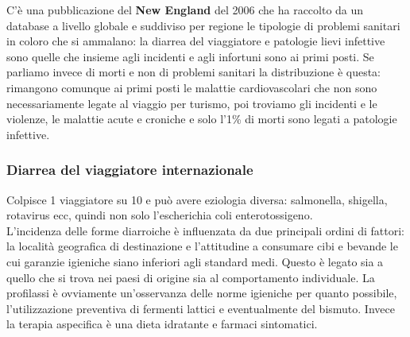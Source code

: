 C'è una pubblicazione del \textbf{New England} del 2006 che ha raccolto
da un database a livello globale e suddiviso per regione le tipologie di
problemi sanitari in coloro che si ammalano: la diarrea del viaggiatore
e patologie lievi infettive sono quelle che insieme agli incidenti e
agli infortuni sono ai primi posti. Se parliamo invece di morti e non di
problemi sanitari la distribuzione è questa: rimangono comunque ai primi
posti le malattie cardiovascolari che non sono necessariamente legate al
viaggio per turismo, poi troviamo gli incidenti e le violenze, le
malattie acute e croniche e solo l'1\% di morti sono legati a patologie
infettive.

\subsubsection{Diarrea del viaggiatore internazionale}
Colpisce 1 viaggiatore su 10 e può avere eziologia diversa: salmonella,
shigella, rotavirus ecc, quindi non solo l'escherichia coli
enterotossigeno.\\
L'incidenza delle forme diarroiche è influenzata da due principali
ordini di fattori: la località geografica di destinazione e l'attitudine
a consumare cibi e bevande le cui garanzie igieniche siano inferiori
agli standard medi. Questo è legato sia a quello che si trova nei paesi
di origine sia al comportamento individuale. La profilassi è ovviamente
un'osservanza delle norme igieniche per quanto possibile,
l'utilizzazione preventiva di fermenti lattici e eventualmente del
bismuto. Invece la terapia aspecifica è una dieta idratante e farmaci
sintomatici.


